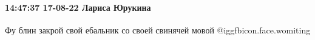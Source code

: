  
 
 
 
 

\paragraph{14:47:37 17-08-22 Лариса Юрукина}

Фу блин закрой свой ебальник со своей свинячей мовой  @igg{fbicon.face.womiting} 
